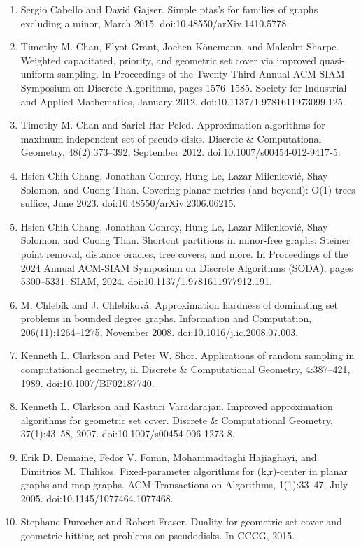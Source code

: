\begin{enumerate}
\item[]  [10]  Sergio Cabello and David Gajser.  Simple ptas’s for families of graphs excluding a minor, March 2015.  doi:10.48550/arXiv.1410.5778.  
\item[]  [11]  Timothy M. Chan, Elyot Grant, Jochen Könemann, and Malcolm Sharpe.  Weighted capacitated, priority, and geometric set cover via improved quasi-uniform sampling.  In Proceedings of the Twenty-Third Annual ACM-SIAM Symposium on Discrete Algorithms, pages 1576–1585. Society for Industrial and Applied Mathematics, January 2012.  doi:10.1137/1.9781611973099.125.  
\item[]  [12]  Timothy M. Chan and Sariel Har-Peled.  Approximation algorithms for maximum independent set of pseudo-disks.  Discrete \& Computational Geometry, 48(2):373–392, September 2012.  doi:10.1007/s00454-012-9417-5.  
\item[]  [13]  Hsien-Chih Chang, Jonathan Conroy, Hung Le, Lazar Milenković, Shay Solomon, and Cuong Than.  Covering planar metrics (and beyond): O(1) trees suffice, June 2023.  doi:10.48550/arXiv.2306.06215.  
\item[]  [14]  Hsien-Chih Chang, Jonathan Conroy, Hung Le, Lazar Milenković, Shay Solomon, and Cuong Than.  Shortcut partitions in minor-free graphs: Steiner point removal, distance oracles, tree covers, and more.  In Proceedings of the 2024 Annual ACM-SIAM Symposium on Discrete Algorithms (SODA), pages 5300–5331. SIAM, 2024.  doi:10.1137/1.9781611977912.191.  
\item[]  [15]  M. Chlebík and J. Chlebíková.  Approximation hardness of dominating set problems in bounded degree graphs.  Information and Computation, 206(11):1264–1275, November 2008.  doi:10.1016/j.ic.2008.07.003.  
\item[]  [16]  Kenneth L. Clarkson and Peter W. Shor.  Applications of random sampling in computational geometry, ii.  Discrete \& Computational Geometry, 4:387–421, 1989.  doi:10.1007/BF02187740.  
\item[]  [17]  Kenneth L. Clarkson and Kasturi Varadarajan.  Improved approximation algorithms for geometric set cover.  Discrete \& Computational Geometry, 37(1):43–58, 2007.  doi:10.1007/s00454-006-1273-8.  
\item[]  [18]  Erik D. Demaine, Fedor V. Fomin, Mohammadtaghi Hajiaghayi, and Dimitrios M. Thilikos.  Fixed-parameter algorithms for (k,r)-center in planar graphs and map graphs.  ACM Transactions on Algorithms, 1(1):33–47, July 2005.  doi:10.1145/1077464.1077468.  
\item[]  [19]  Stephane Durocher and Robert Fraser.  Duality for geometric set cover and geometric hitting set problems on pseudodisks.  In CCCG, 2015.  

\end{enumerate}
